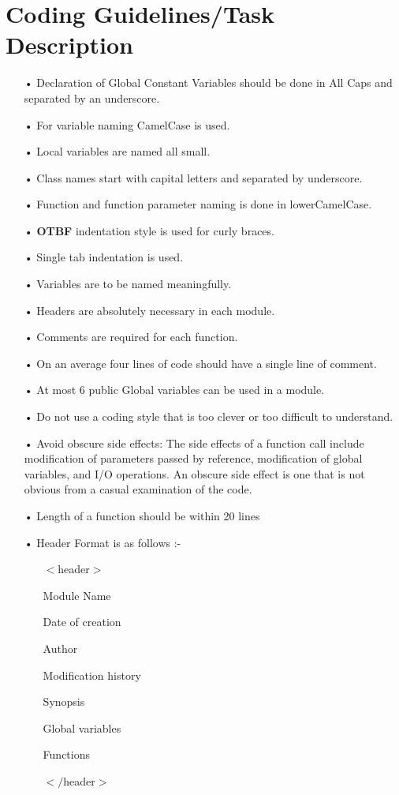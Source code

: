 \documentclass{scrreprt}
\begin{document}
\chapter{Coding Guidelines/Task Description}
\begin{itemize}
\item[•] Declaration of Global Constant Variables should be done in All Caps and separated by an underscore.
\item[•] For variable naming CamelCase is used.
\item[•] Local variables are named all small.
\item[•] Class names start with capital letters and separated by
underscore.
\item[•] Function and function parameter naming is done in lowerCamelCase.
\item[•] \textbf{OTBF} indentation style is used for curly braces.
\item[•] Single tab indentation is used.
\item[•] Variables are to be named meaningfully.
\item[•] Headers are absolutely necessary in each module.
\item[•] Comments are required for each function.
\item[•] On an average four lines of code should have a single line of
comment.
\item[•] At most 6 public Global variables can be used in a module.
\item[•] Do not use a coding style that is too clever or too difficult to understand.
\item[•] Avoid obscure side effects: The side effects of a function call include modification of parameters passed by reference,
modification of global variables, and I/O operations. An obscure
side effect is one that is not obvious from a casual examination of
the code.
\item[•] Length of a function should be within 20 lines
\newpage
\item[•] Header Format is as follows :-
\begin{itemize}
\item[] $<$header$>$
\item[] Module Name
\item[] Date of creation
\item[] Author
\item[] Modification history
\item[] Synopsis
\item[] Global variables
\item[] Functions
\item[] $</$header$>$
\end{itemize}
\end{itemize}
\end{document}
